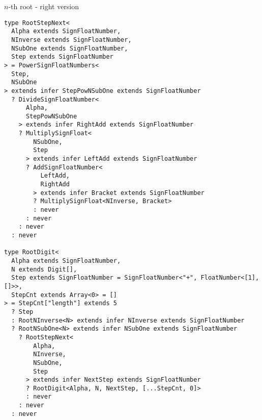 \begin{listing}[ht]
\caption{$n$-th root - right version}\label{lst:root-right}
\begin{verbatim}
type RootStepNext<
  Alpha extends SignFloatNumber,
  NInverse extends SignFloatNumber,
  NSubOne extends SignFloatNumber,
  Step extends SignFloatNumber
> = PowerSignFloatNumbers<
  Step,
  NSubOne
> extends infer StepPowNSubOne extends SignFloatNumber
  ? DivideSignFloatNumber<
      Alpha,
      StepPowNSubOne
    > extends infer RightAdd extends SignFloatNumber
    ? MultiplySignFloat<
        NSubOne,
        Step
      > extends infer LeftAdd extends SignFloatNumber
      ? AddSignFloatNumber<
          LeftAdd,
          RightAdd
        > extends infer Bracket extends SignFloatNumber
        ? MultiplySignFloat<NInverse, Bracket>
        : never
      : never
    : never
  : never

type RootDigit<
  Alpha extends SignFloatNumber,
  N extends Digit[],
  Step extends SignFloatNumber = SignFloatNumber<"+", FloatNumber<[1], []>>,
  StepCnt extends Array<0> = []
> = StepCnt["length"] extends 5
  ? Step
  : RootNInverse<N> extends infer NInverse extends SignFloatNumber
  ? RootNSubOne<N> extends infer NSubOne extends SignFloatNumber
    ? RootStepNext<
        Alpha,
        NInverse,
        NSubOne,
        Step
      > extends infer NextStep extends SignFloatNumber
      ? RootDigit<Alpha, N, NextStep, [...StepCnt, 0]>
      : never
    : never
  : never
\end{verbatim}
\end{listing}